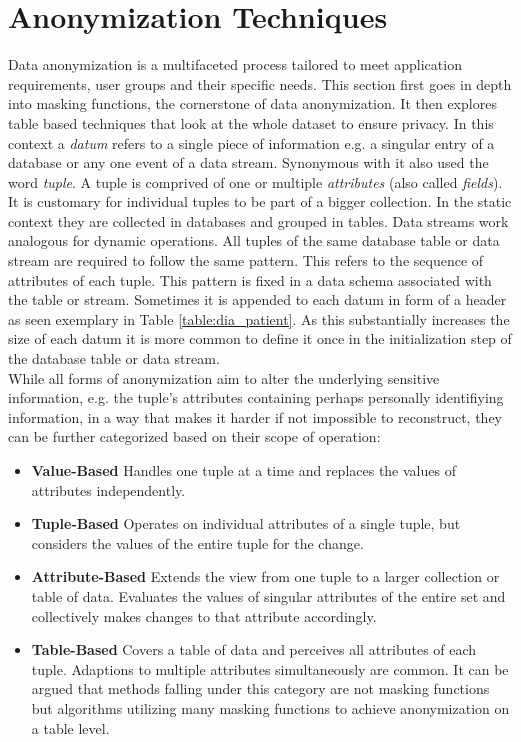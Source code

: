 \section{Anonymization Techniques}
Data anonymization is a multifaceted process tailored to meet application requirements, user groups and their specific needs. This section first goes in depth into masking functions, the cornerstone of data anonymization. It then explores table based techniques that look at the whole dataset to ensure privacy. In this context a \textit{datum} refers to a single piece of information e.g. a singular entry of a database or any one event of a data stream. Synonymous with it also used the word \textit{tuple}. A tuple is comprived of one or multiple \textit{attributes} (also called \textit{fields}). It is customary for individual tuples to be part of a bigger collection. In the static context they are collected in databases and grouped in tables. Data streams work analogous for dynamic operations. All tuples of the same database table or data stream are required to follow the same pattern. This refers to the sequence of attributes of each tuple. This pattern is fixed in a data schema associated with the table or stream. Sometimes it is appended to each datum in form of a header as seen exemplary in Table \ref{table:dia_patient}. As this substantially increases the size of each datum it is more common to define it once in the initialization step of the database table or data stream. \\
While all forms of anonymization aim to alter the underlying sensitive information, e.g. the tuple's attributes containing perhaps personally identifiying information, in a way that makes it harder if not impossible to reconstruct, they can be further categorized based on their scope of operation:

\begin{itemize}
    \item \textbf{Value-Based} Handles one tuple at a time and replaces the values of attributes independently. 
    \item \textbf{Tuple-Based} Operates on individual attributes of a single tuple, but considers the values of the entire tuple for the change. 
    \item \textbf{Attribute-Based} Extends the view from one tuple to a larger collection or table of data. Evaluates the values of singular attributes of the entire set and collectively makes changes to that attribute accordingly. 
    \item \textbf{Table-Based} Covers a table of data and perceives all attributes of each tuple. Adaptions to multiple attributes simultaneously are common. It can be argued that methods falling under this category are not masking functions but algorithms utilizing many masking functions to achieve anonymization on a table level.  
\end{itemize}


